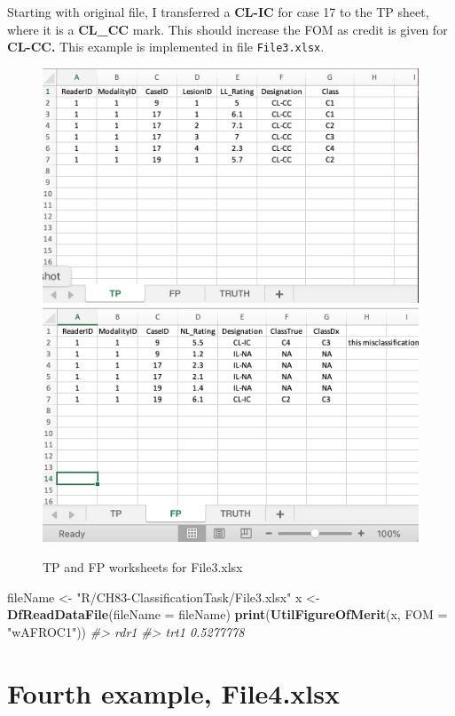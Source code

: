 \documentclass[
]{book}
\newenvironment{Shaded}{\begin{snugshade}}{\end{snugshade}}
\newcommand{\CommentTok}[1]{\textcolor[rgb]{0.56,0.35,0.01}{\textit{#1}}}
\newcommand{\DataTypeTok}[1]{\textcolor[rgb]{0.13,0.29,0.53}{#1}}
\newcommand{\KeywordTok}[1]{\textcolor[rgb]{0.13,0.29,0.53}{\textbf{#1}}}
\newcommand{\NormalTok}[1]{#1}
\newcommand{\StringTok}[1]{\textcolor[rgb]{0.31,0.60,0.02}{#1}}
\begin{document}
Starting with original file, I transferred a \textbf{CL-IC} for case 17 to the TP sheet, where it is a \textbf{CL\_CC} mark. This should increase the FOM as credit is given for \textbf{CL-CC.} This example is implemented in file \texttt{File3.xlsx}.

\begin{figure}

{\centering \includegraphics[width=0.5\linewidth,height=0.2\textheight]{images/classification/File3TP} \includegraphics[width=0.5\linewidth,height=0.2\textheight]{images/classification/File3FP} 

}

\caption{TP and FP worksheets for File3.xlsx}\label{fig:File3TPFP}
\end{figure}

\begin{Shaded}
\begin{Highlighting}[]
\NormalTok{fileName <-}\StringTok{ "R/CH83-ClassificationTask/File3.xlsx"}
\NormalTok{x <-}\StringTok{ }\KeywordTok{DfReadDataFile}\NormalTok{(}\DataTypeTok{fileName =}\NormalTok{ fileName)}
\KeywordTok{print}\NormalTok{(}\KeywordTok{UtilFigureOfMerit}\NormalTok{(x, }\DataTypeTok{FOM =} \StringTok{"wAFROC1"}\NormalTok{))}
\CommentTok{#>           rdr1}
\CommentTok{#> trt1 0.5277778}
\end{Highlighting}
\end{Shaded}

\hypertarget{classification-tasks-example4}{%
\section{Fourth example, File4.xlsx}\label{classification-tasks-example4}}
\end{document}
